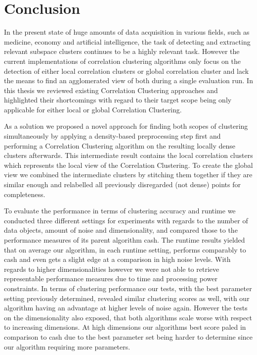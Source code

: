 \chapter{Conclusion}\label{ch:conclusion}
In the present state of huge amounts of data acquisition in various fields,  such as medicine, economy and artificial intelligence, the task of detecting and extracting relevant subspace clusters continues to be a highly relevant task. However the current implementations of correlation clustering algorithms only focus on the detection of either local correlation clusters or global correlation cluster and lack the means to find an agglomerated view of both during a single evaluation run. In this thesis we reviewed existing Correlation Clustering approaches and highlighted their shortcomings with regard to their target scope being only applicable for either local or global Correlation Clustering. 

As a solution we proposed a novel approach for finding both scopes of clustering simultaneously by applying a density-based preprocessing step first and performing a Correlation Clustering algorithm on the resulting locally dense clusters afterwards. This intermediate result contains the local correlation clusters which represents the local view of the Correlation Clustering. To create the global view we combined the intermediate clusters by stitching them together if they are similar enough and relabelled all previously disregarded (not dense) points for completeness.

To evaluate the performance in terms of clustering accuracy and runtime we conducted three different settings for experiments with regards to the number of data objects, amount of noise and dimensionality, and compared those to the performance measures of its parent algorithm \gls{cash}. 
The runtime results yielded that on average our algorithm, in each runtime setting, performs comparably to \gls{cash} and even gets a slight edge at a comparison in high noise levels. With regards to higher dimensionalities however we were not able to retrieve representable performance measures due to time and processing power constraints. In terms of clustering performance our tests, with the best parameter setting previously determined, revealed similar clustering scores as well, with our algorithm having an advantage at higher levels of noise again. However the tests on the dimensionality also exposed, that both algorithms scale worse with respect to increasing dimensions. At high dimensions our algorithms best score paled in comparison to \gls{cash} due to the best parameter set being harder to determine since our algorithm requiring more parameters.

